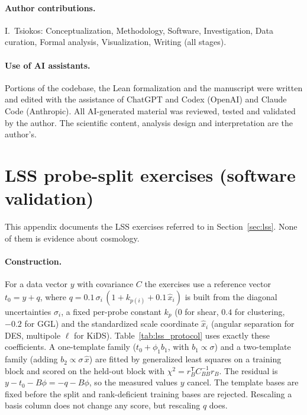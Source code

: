 \documentclass[11pt]{article}
\theoremstyle{plain}
\theoremstyle{definition}
\theoremstyle{remark}
\begin{document}
\paragraph{Author contributions.}
I.\ Tsiokos: Conceptualization, Methodology, Software, Investigation, Data curation, Formal analysis, Visualization, Writing (all stages).

\paragraph{Use of AI assistants.}
Portions of the codebase, the Lean formalization and the manuscript were written and edited with the assistance of ChatGPT and Codex (OpenAI) and Claude Code (Anthropic). All AI-generated material was reviewed, tested and validated by the author. The scientific content, analysis design and interpretation are the author's.

\appendix

\section{LSS probe-split exercises (software validation)}\label{app:lss}

This appendix documents the LSS exercises referred to in Section~\ref{sec:lss}. None of them is evidence about cosmology.

\paragraph{Construction.}
For a data vector $y$ with covariance $C$ the exercises use a reference vector $t_0=y+q$, where $q=0.1\,\sigma_i\,(1+k_{p(i)}+0.1\,\hat x_i)$ is built from the diagonal uncertainties $\sigma_i$, a fixed per-probe constant $k_p$ (0 for shear, $0.4$ for clustering, $-0.2$ for GGL) and the standardized scale coordinate $\hat x_i$ (angular separation for DES, multipole $\ell$ for KiDS). Table~\ref{tab:lss_protocol} uses exactly these coefficients. A one-template family ($t_0+\phi_1 b_1$, with $b_1\propto\sigma$) and a two-template family (adding $b_2\propto\sigma\,\hat x$) are fitted by generalized least squares on a training block and scored on the held-out block with $\chi^2=r_B^{\mathsf T}C_{BB}^{-1}r_B$. The residual is $y-t_0-B\phi=-q-B\phi$, so the measured values $y$ cancel. The template bases are fixed before the split and rank-deficient training bases are rejected. Rescaling a basis column does not change any score, but rescaling $q$ does.
\end{document}
